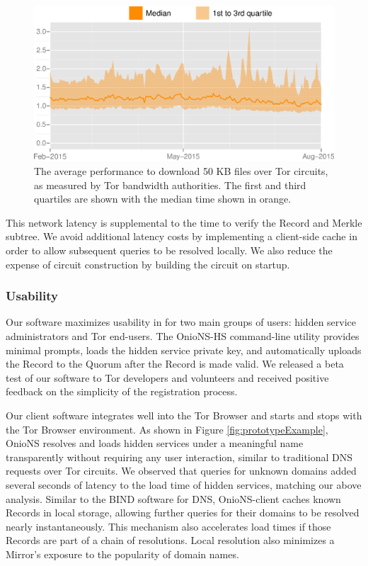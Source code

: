 \documentclass[conference]{IEEEtran}
\begin{document}
\begin{figure}[h]
	\centering
	\includegraphics[width=\linewidth]{../assets/images/torperf_50kb_2015-02_2015-08.eps}
	\caption{The average performance to download 50 KB files over Tor circuits, as measured by Tor bandwidth authorities. The first and third quartiles are shown with the median time shown in orange\cite{TorMetrics}.}
	\label{fig:latencyGraph}
\end{figure}

This network latency is supplemental to the time to verify the Record and Merkle subtree. We avoid additional latency costs by implementing a client-side cache in order to allow subsequent queries to be resolved locally. We also reduce the expense of circuit construction by building the circuit on startup.

\subsubsection{Usability}

Our software maximizes usability in for two main groups of users: hidden service administrators and Tor end-users. The OnioNS-HS command-line utility provides minimal prompts, loads the hidden service private key, and automatically uploads the Record to the Quorum after the Record is made valid. We released a beta test of our software to Tor developers and volunteers and received positive feedback on the simplicity of the registration process.

Our client software integrates well into the Tor Browser and starts and stops with the Tor Browser environment. As shown in Figure \ref{fig:prototypeExample}, OnioNS resolves and loads hidden services under a meaningful name transparently without requiring any user interaction, similar to traditional DNS requests over Tor circuits. We observed that queries for unknown domains added several seconds of latency to the load time of hidden services, matching our above analysis. Similar to the BIND software for DNS, OnioNS-client caches known Records in local storage, allowing further queries for their domains to be resolved nearly instantaneously. This mechanism also accelerates load times if those Records are part of a chain of resolutions. Local resolution also minimizes a Mirror's exposure to the popularity of domain names.
\end{document}
